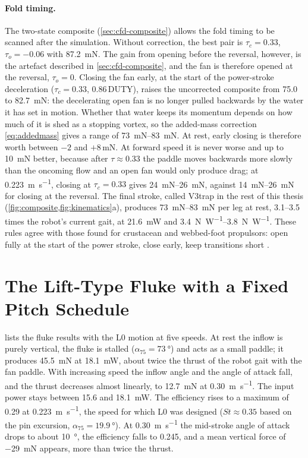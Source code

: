 \paragraph{Fold timing.} The two-state composite (\cref{sec:cfd-composite}) allows the fold timing to be scanned
after the simulation. Without correction, the best pair is $\tau_c=0.33$, $\tau_o=-0.06$ with \SI{87.2}{\milli\newton}. The gain
from opening before the reversal, however, is the artefact described in \cref{sec:cfd-composite}, and the fan is therefore
opened at the reversal, $\tau_o=0$. Closing the fan early, at the start of the power-stroke deceleration ($\tau_c=0.33$,
0.86\,DUTY), raises the uncorrected composite from \SI{75.0}{} to \SI{82.7}{\milli\newton}: the decelerating open fan is no longer
pulled backwards by the water it has set in motion. Whether that water keeps its momentum depends on how much of it is shed as
a stopping vortex, so the added-mass correction \eqref{eq:addedmass} gives a range of \SIrange{73}{83}{\milli\newton}. At rest,
early closing is therefore worth between $-2$ and $+8$\,mN. At forward speed it is never worse and up to \SI{10}{\milli\newton} better, because after $\tau\approx0.33$ the paddle moves backwards more slowly than the oncoming flow and an open fan would only
produce drag; at \SI{0.223}{\metre\per\second}, closing at $\tau_c=0.33$ gives \SIrange{24}{26}{\milli\newton}, against \SIrange{14}{26}{\milli\newton} for closing at the reversal. The final stroke, called V3trap in the rest of this thesis (\cref{fig:composite,fig:kinematics}a),
produces \SIrange{73}{83}{\milli\newton} per leg at rest, 3.1--3.5 times the robot's current gait, at \SI{21.6}{\milli\watt} and
\SIrange{3.4}{3.8}{\newton\per\watt}. These rules agree with those found for crustacean and webbed-foot propulsors: open fully at
the start of the power stroke, close early, keep transitions short \cite{Santos2026,Lin2024}.

\section{The Lift-Type Fluke with a Fixed Pitch Schedule}
\label{sec:res-lift}

 lists the fluke results with the L0 motion at five speeds. At rest the inflow is purely vertical,
the fluke is stalled ($\alpha_{75}=\SI{73}{\degree}$) and acts as a small paddle; it produces
\SI{45.5}{\milli\newton} at \SI{18.1}{\milli\watt}, about twice the thrust of the robot gait with the fan paddle.
With increasing speed the inflow angle and the angle of attack fall, and the thrust decreases almost linearly, to
\SI{12.7}{\milli\newton} at \SI{0.30}{\metre\per\second}. The input power stays between \SI{15.6}{} and
\SI{18.1}{\milli\watt}. The efficiency rises to a maximum of 0.29 at \SI{0.223}{\metre\per\second}, the speed for
which L0 was designed ($\mathit{St}\approx0.35$ based on the pin excursion, $\alpha_{75}=\SI{19.9}{\degree}$). At
\SI{0.30}{\metre\per\second} the mid-stroke angle of attack drops to about \SI{10}{\degree}, the efficiency falls
to 0.245, and a mean vertical force of \SI{-29}{\milli\newton} appears, more than twice the thrust.

